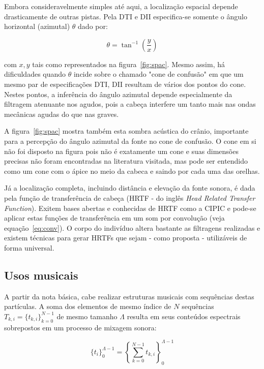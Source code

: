 Embora consideravelmente simples até aqui, a localização espacial depende drasticamente de outras pistas. Pela
DTI e DII especifica-se somente o ângulo horizontal (azimutal) $\theta$ dado por:

\begin{equation}\label{eq:angulo}
\theta=\tan^{-1}\left ( \frac{y}{ x }  \right )
\end{equation}

com $x,y$ tais como representados na figura~\ref{fig:spac}. Mesmo assim, há dificuldades quando $\theta$ incide sobre o chamado "cone de confusão" em que um mesmo par de especificações DTI, DII resultam de vários dos pontos 
do cone. Nestes pontos, a inferência do ângulo azimutal depende especialmente da filtragem atenuante nos agudos, pois a cabeça interfere um tanto mais nas ondas mecânicas agudas do que nas graves.\cite{Heeger,hrtf} 

A figura~\ref{fig:spac} mostra também esta sombra acústica do crânio, importante para a percepção do ângulo azimutal da fonte no cone de confusão. O cone em si não foi disposto na figura pois não é exatamente um cone e suas dimensões precisas não foram encontradas na literatura visitada, mas pode ser entendido como um cone com o ápice no meio da cabeca e saindo por cada uma das orelhas.\cite{hrtf}

Já a localização completa, incluindo distância e elevação da fonte sonora, é dada pela função de transferência de cabeça (HRTF - do inglês \emph{Head Related Transfer Function}).\cite{hrtf} Exitem bases abertas e conhecidas de HRTF como a CIPIC e pode-se aplicar estas funções de transferência em um som por convolução (veja equação~\ref{eq:conv}).\cite{CIPIC} O corpo do indivíduo altera bastante as filtragens realizadas e existem técnicas para gerar HRTFs que sejam - como proposta - utilizáveis de forma universal.\cite{lazaSPA} 



\subsection{Usos musicais}\label{subsec:basMus}


A partir da nota básica, cabe realizar estruturas musicais com
sequências destas partículas. A soma dos elementos de mesmo índice de $N$ sequências $T_{k,i}=\{t_{k,i}\}_{k=0}^{N-1}$ de mesmo tamanho $\Lambda$ resulta em seus conteúdos espectrais sobrepostos em um processo de mixagem sonora:

\begin{equation}\label{eq:mixagem}
\{t_i\}_0^{\Lambda-1}=\left \{ \sum_{k=0}^{N-1}t_{k,i} \right \}_0^{\Lambda-1}
\end{equation}

